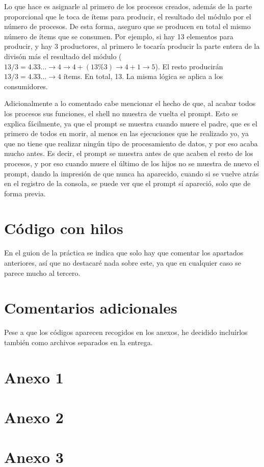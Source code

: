 \documentclass[a4paper]{article}
\begin{document}
Lo que hace es asignarle al primero de los procesos creados, además de la parte proporcional que le toca de ítems para producir, el resultado del módulo por el número de procesos. De esta forma, aseguro que se producen en total el mismo número de ítems que se consumen. Por ejemplo, si hay 13 elementos para producir, y hay 3 productores, al primero le tocaría producir la parte entera de la divisón más el resultado del módulo ($13/3=4.33\dots \rightarrow 4 \rightarrow 4 + (13 \% 3) \rightarrow 4 + 1 \rightarrow 5$). El resto producirán $13/3=4.33\dots \rightarrow 4$ ítems. En total, 13. La misma lógica se aplica a los consumidores.

Adicionalmente a lo comentado cabe mencionar el hecho de que, al acabar todos los procesos sus funciones, el shell no muestra de vuelta el prompt. Esto se explica fácilmente, ya que el prompt se muestra cuando muere el padre, que es el primero de todos en morir, al menos en las ejecuciones que he realizado yo, ya que no tiene que realizar ningún tipo de procesamiento de datos, y por eso acaba mucho antes. Es decir, el prompt se muestra antes de que acaben el resto de los procesos, y por eso cuando muere el último de los hijos no se muestra de nuevo el prompt, dando la impresión de que nunca ha aparecido, cuando si se vuelve atrás en el registro de la consola, se puede ver que el prompt sí apareció, solo que de forma previa.

\section{Código con hilos}

En el guion de la práctica se indica que solo hay que comentar los apartados anteriores, así que no destacaré nada sobre este, ya que en cualquier caso se parece mucho al tercero.

\section{Comentarios adicionales}

Pese a que los códigos aparecen recogidos en los anexos, he decidido incluírlos también como archivos separados en la entrega.
    
\begin{appendices} 
\section{\LARGE \textbf{Anexo 1}}\label{anexo1}

    
\section{\LARGE \textbf{Anexo 2}}\label{anexo2}

    
\section{\LARGE \textbf{Anexo 3}}\label{anexo3}

    
\end{appendices}
\end{document}
